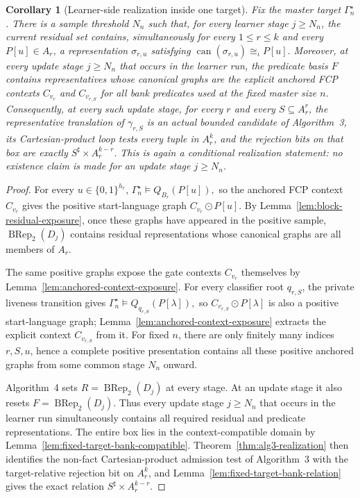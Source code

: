 \documentclass[11pt]{article}
\newtheorem{corollary}[theorem]{Corollary}
\theoremstyle{definition}
\theoremstyle{remark}
\begin{document}
\begin{corollary}[Learner-side realization inside one target]
\label{cor:single-target-learner-realization}
Fix the master target \(\Gamma_n^\star\).  There is a sample threshold \(N_n\)
such that, for every learner stage \(j\ge N_n\), the current residual set
contains, simultaneously for every \(1\le r\le k\) and every \(P[u]\in A_r\),
a representation \(\sigma_{r,u}\) satisfying
\(\operatorname{can}(\sigma_{r,u})\cong_\iota P[u].\)
Moreover, at every update stage \(j\ge N_n\) that occurs in the learner run,
the predicate basis \(F\) contains representatives whose canonical graphs are
the explicit anchored FCP contexts \(C_{v_r}\) and \(C_{v_{r,S}}\) for all
bank predicates used at the fixed master size \(n\).  Consequently, at every
such update stage, for every \(r\) and every \(S\subseteq A_r^r\), the
representative translation of \(\gamma_{r,S}\) is an actual bounded candidate
of Algorithm~3, its Cartesian-product loop tests every tuple in \(A_r^k\),
and the rejection bits
on that box are exactly
\(S^\sharp\times A_r^{k-r}.\)
This is again a conditional realization statement: no existence claim is made
for an update stage \(j\ge N_n\).
\end{corollary}

\begin{proof}
For every \(u\in\{0,1\}^{h_r}\),
\(\Gamma_n^\star\models Q_{B_r}(P[u]),\)
so the anchored FCP context \(C_{v_r}\) gives the positive start-language
graph \(C_{v_r}\odot P[u]\).  By
Lemma~\ref{lem:block-residual-exposure}, once these graphs have appeared in the
positive sample, \(\operatorname{BRep}_2(D_j)\) contains residual
representations whose canonical graphs are all members of \(A_r\).

The same positive graphs expose the gate contexts \(C_{v_r}\) themselves by
Lemma~\ref{lem:anchored-context-exposure}.  For every classifier root
\(q_{r,S}\), the private liveness transition gives
\(\Gamma_n^\star\models Q_{q_{r,S}}(P[\lambda]),\)
so \(C_{v_{r,S}}\odot P[\lambda]\) is also a positive start-language graph;
Lemma~\ref{lem:anchored-context-exposure} extracts the explicit context
\(C_{v_{r,S}}\) from it.  For fixed \(n\), there are only finitely many
indices \(r,S,u\), hence a complete positive presentation contains all these
positive anchored graphs from some common stage \(N_n\) onward.

Algorithm~4 sets
\(R=\operatorname{BRep}_2(D_j)\) at every stage.  At an update stage it
also resets \(F=\operatorname{BRep}_2(D_j)\).  Thus every update stage \(j\ge N_n\) that occurs in the learner run
simultaneously contains all required residual and predicate representations.  The entire box lies in the context-compatible domain by
Lemma~\ref{lem:fixed-target-bank-compatible}.  Theorem~\ref{thm:alg3-realization}
then identifies the non-fact Cartesian-product admission test of Algorithm~3
with the target-relative rejection bit on \(A_r^k\), and Lemma~\ref{lem:fixed-target-bank-relation} gives the
exact relation \(S^\sharp\times A_r^{k-r}\).
\end{proof}
\end{document}

